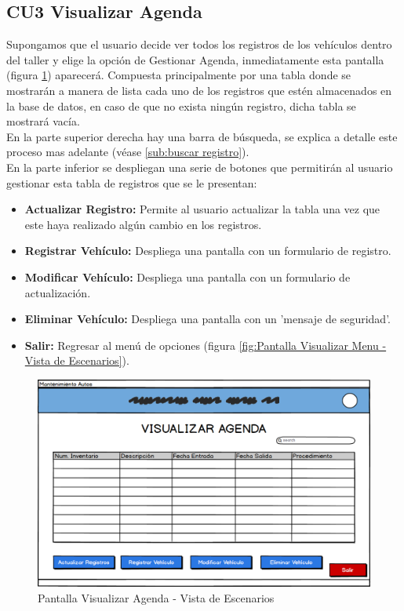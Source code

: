 \subsection{CU3 Visualizar Agenda}
Supongamos que el usuario decide ver todos los registros de los vehículos dentro del taller y elige la opción de Gestionar Agenda, inmediatamente esta pantalla (figura \ref{fig:Pantalla Visualizar Agenda - Vista de Escenarios}) aparecerá. Compuesta principalmente por una tabla donde se mostrarán a manera de lista cada uno de los registros que estén almacenados en la base de datos, en caso de que no exista ningún registro, dicha tabla se mostrará vacía.
\\
En la parte superior derecha hay una barra de búsqueda, se explica a detalle este proceso mas adelante (véase \ref{sub:buscar registro}). 
\\
En la parte inferior se despliegan una serie de botones que permitirán al usuario gestionar esta tabla de registros que se le presentan:
\begin{itemize}
	\item \textbf{Actualizar Registro:} Permite al usuario actualizar la tabla una vez que este haya realizado algún cambio en los registros.
	\item \textbf{Registrar Vehículo:} Despliega una pantalla con un formulario de registro.
	\item \textbf{Modificar Vehículo:} Despliega una pantalla con un formulario de actualización.
	\item \textbf{Eliminar Vehículo:} Despliega una pantalla con un 'mensaje de seguridad'. 
	\item \textbf{Salir:} Regresar al menú de opciones (figura \ref{fig:Pantalla Visualizar Menu - Vista de Escenarios}). 
\end{itemize}
\begin{figure}[!h]
	\centering
	\includegraphics[width=1\textwidth]{./diseno/vescenarios/imagenes/VisualizarAgenda}
	\caption{Pantalla Visualizar Agenda - Vista de Escenarios}
	\label{fig:Pantalla Visualizar Agenda - Vista de Escenarios}
\end{figure}
